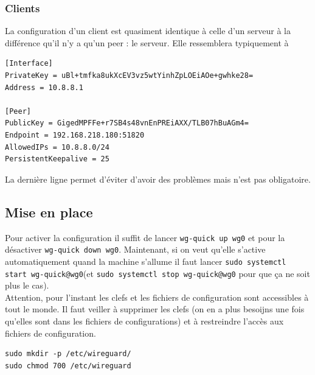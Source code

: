 \documentclass[a4paper, 12pt]{article}
\begin{document}
\subsubsection{Clients}
La configuration d'un client est quasiment identique à celle d'un serveur à la différence qu'il n'y a qu'un peer : le serveur. Elle ressemblera typiquement à 
\begin{verbatim}
[Interface]
PrivateKey = uBl+tmfka8ukXcEV3vz5wtYinhZpLOEiAOe+gwhke28=
Address = 10.8.8.1

[Peer]
PublicKey = GigedMPFFe+r7SB4s48vnEnPREiAXX/TLB07hBuAGm4= 
Endpoint = 192.168.218.180:51820
AllowedIPs = 10.8.8.0/24
PersistentKeepalive = 25
\end{verbatim}
La dernière ligne permet d'éviter d'avoir des problèmes mais n'est pas obligatoire.
\subsection{Mise en place}
Pour activer la configuration il suffit de lancer \verb+wg-quick up wg0+ et pour la désactiver \verb+wg-quick down wg0+. Maintenant, si on veut qu'elle s'active automatiquement quand la machine s'allume il faut lancer \verb+sudo systemctl start wg-quick@wg0+(et \verb+sudo systemctl stop wg-quick@wg0+ pour que ça ne soit plus le cas). \\

Attention, pour l'instant les clefs et les fichiers de configuration sont accessibles à tout le monde. Il faut veiller à supprimer les clefs (on en a plus besoijns une fois qu'elles sont dans les fichiers de configurations) et à restreindre l'accès aux fichiers de configuration. 
\begin{verbatim}
sudo mkdir -p /etc/wireguard/
sudo chmod 700 /etc/wireguard
\end{verbatim}

\printbibliography
\end{document}
